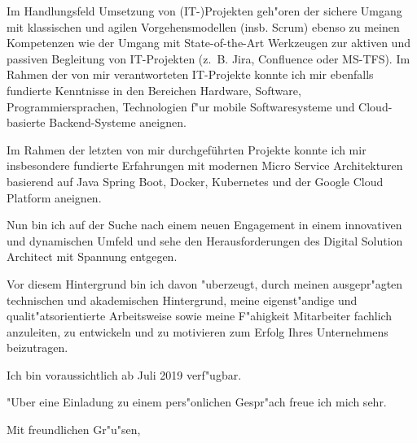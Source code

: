 \documentclass[11pt,a4paper]{dinbrief}
\begin{document}
\begin{letter}
Im Handlungsfeld Umsetzung von (IT-)Projekten geh"oren der sichere Umgang mit klassischen und agilen Vorgehensmodellen (insb. Scrum) ebenso zu meinen Kompetenzen wie der Umgang mit State-of-the-Art Werkzeugen zur aktiven und passiven Begleitung von IT-Projekten (z.~B. Jira, Confluence oder MS-TFS). Im Rahmen der von mir verantworteten IT-Projekte konnte ich mir ebenfalls fundierte Kenntnisse in den Bereichen Hardware, Software, Programmiersprachen, Technologien f"ur mobile Softwaresysteme und Cloud-basierte Backend-Systeme aneignen.

Im Rahmen der letzten von mir durchgeführten Projekte konnte ich mir insbesondere fundierte Erfahrungen mit modernen Micro Service Architekturen basierend auf Java Spring Boot, Docker, Kubernetes und der Google Cloud Platform aneignen.


Nun bin ich auf der Suche nach einem neuen Engagement in einem innovativen und dynamischen Umfeld und sehe den Herausforderungen des Digital Solution Architect mit Spannung entgegen.

Vor diesem Hintergrund bin ich davon "uberzeugt, durch meinen ausgepr"agten technischen und akademischen Hintergrund, meine eigenst"andige und qualit"atsorientierte Arbeitsweise sowie meine F"ahigkeit Mitarbeiter fachlich anzuleiten, zu entwickeln und zu motivieren zum Erfolg Ihres Unternehmens beizutragen.

Ich bin voraussichtlich ab Juli 2019 verf"ugbar.

"Uber eine Einladung zu einem pers"onlichen Gespr"ach freue ich mich sehr.

\closing{Mit freundlichen Gr"u"sen,}
\end{letter}
\end{document}
